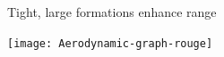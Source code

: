 \documentclass[12pt,svgnames,table,draft=false]{beamer}
\begin{document}

\usebackgroundtemplate{} 
\begin{frame}{Tight, large formations enhance range\cite{Hummel1982}}
\begin{center}
\texttt{[image: Aerodynamic-graph-rouge]}
\end{center}
\end{frame}
\end{document}

